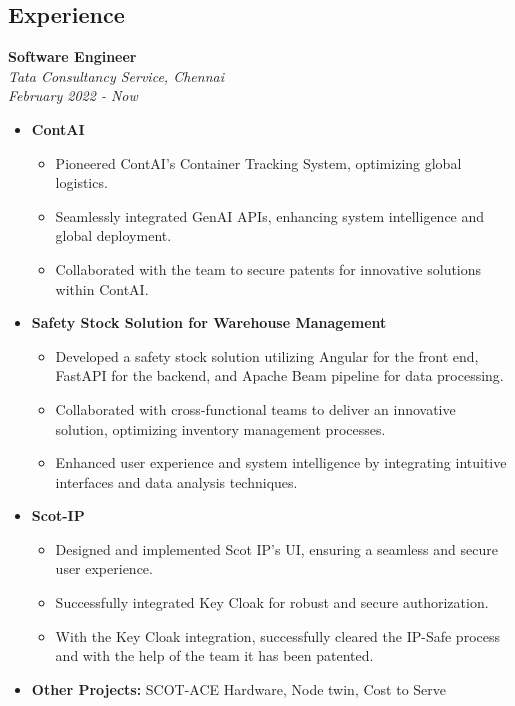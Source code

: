 \documentclass[letterpaper,10pt]{article}
\begin{document}
\begin{multicols}{2}

\section*{Experience}

\textbf{Software Engineer} \\
\textit{Tata Consultancy Service, Chennai} \\
\textit{February 2022 - Now}
\begin{itemize}
    \item \textbf{ContAI}
    \begin{itemize}
        \item Pioneered ContAI's Container Tracking System, optimizing global logistics.
        \item Seamlessly integrated GenAI APIs, enhancing system intelligence and global deployment.
        \item Collaborated with the team to secure patents for innovative solutions within ContAI.
    \end{itemize}
    \item \textbf{Safety Stock Solution for Warehouse Management}
    \begin{itemize}
        \item Developed a safety stock solution utilizing Angular for the front end, FastAPI for the backend, and Apache Beam pipeline for data processing.
        \item Collaborated with cross-functional teams to deliver an innovative solution, optimizing inventory management processes.
        \item Enhanced user experience and system intelligence by integrating intuitive interfaces and data analysis techniques.
    \end{itemize}
    \item \textbf{Scot-IP}
    \begin{itemize}
        \item Designed and implemented Scot IP's UI, ensuring a seamless and secure user experience.
        \item Successfully integrated Key Cloak for robust and secure authorization.
        \item With the Key Cloak integration, successfully cleared the IP-Safe process and with the help of the team it has been patented.
    \end{itemize}
    \item \textbf{Other Projects:} SCOT-ACE Hardware, Node twin, Cost to Serve
\end{itemize}


\end{multicols}
\end{document}
